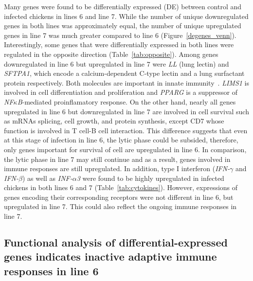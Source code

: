 \documentclass[10pt]{article}
\begin{document}
Many genes were found to be differentially expressed (DE) between control and
infected chickens in lines 6 and line 7.  While the number of unique
downregulated genes in both lines was approximately equal, the number of unique
upregulated genes in line 7 was much greater compared to line 6
(Figure~\ref{degenes_venn}).  Interestingly, some genes
that were differentially expressed in both lines were regulated in the opposite
direction (Table~\ref{tab:opposite}).  Among genes downregulated in line 6 but
upregulated in line 7 were {\em LL} (lung lectin) and {\em SFTPA1}, which encode
a calcium-dependent C-type lectin and a lung surfactant protein respectively.
Both molecules are important in innate
immunity~\cite{hogenkamp2008chicken,kingma2006defense}.  {\em LIMS1} is involved
in cell differentiation and proliferation and {\em PPARG} is a suppressor of
{\em NF$\kappa$B}-mediated proinflamatory response.  On the other hand, nearly
all genes upregulated in line 6 but downregulated in line 7 are involved in cell
survival such as mRNAs splicing, cell growth, and protein synthesis, except CD7
whose function is involved in T cell-B cell interaction.  This difference
suggests that even at this stage of infection in line 6, the lytic phase could
be subsided, therefore, only genes important for survival of cell are
upregulated in line 6.  In comparison, the lytic phase in line 7 may still
continue and as a result, genes involved in immune responses are still
upregulated.  In addition, type I interferon ({\em IFN-$\gamma$} and {\em
IFN-$\beta$}) as well as {\em INF-$\alpha$3} were found to be highly upregulated
in infected chickens in both lines 6 and 7 (Table~\ref{tab:cytokines}).
However, expressions of genes encoding their corresponding receptors were not
different in line 6, but upregulated in line 7.  This could also reflect the
ongoing immune responses in line 7.

\subsection*{Functional analysis of differential-expressed genes indicates
inactive adaptive immune responses in line 6}
\end{document}
